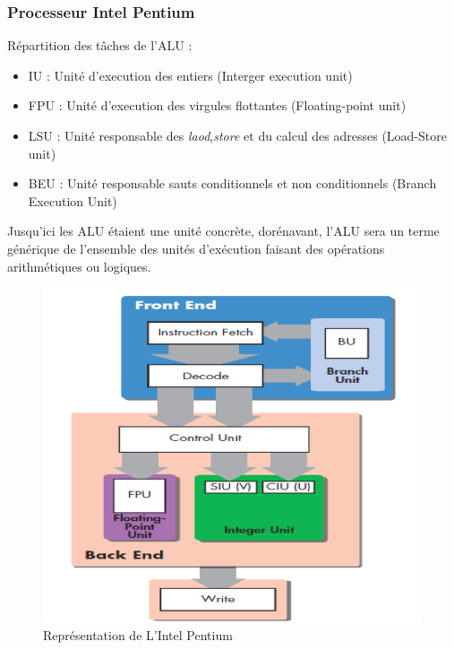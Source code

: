 \documentclass[a4paper]{article}
\begin{document}
    \subsubsection{Processeur Intel Pentium}
    Répartition des tâches de l'ALU :
    \begin{itemize}
      \item IU : Unité d'execution des entiers (Interger execution unit)
      \item FPU : Unité d'execution des virgules flottantes (Floating-point unit)
      \item LSU : Unité responsable des \emph{laod},\emph{store} et du calcul des adresses (Load-Store unit)
      \item BEU : Unité responsable sauts conditionnels et non conditionnels (Branch Execution Unit)
    \end{itemize}
    Jusqu'ici les ALU étaient une unité concrète, dorénavant, l'ALU sera un terme générique de l'ensemble des unités d’exécution faisant des opérations arithmétiques ou logiques.

    \begin{figure}[H]
      \centering
      \includegraphics[width = 0.4 \textwidth]{images/5.PNG}
      \caption{Représentation de L'Intel Pentium}
    \end{figure}
\end{document}

